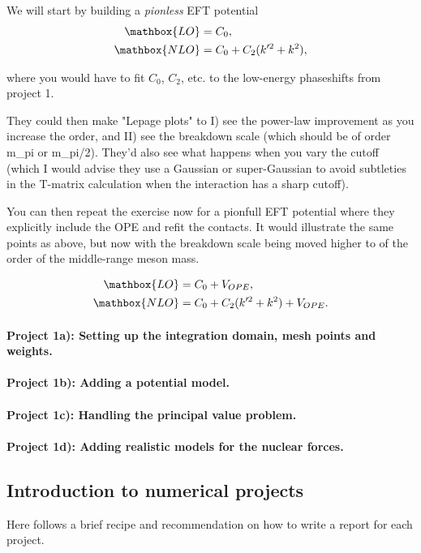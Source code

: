 \documentclass[%
oneside,                 %
final,                   %
10pt]{article}
\begin{document}
We will start by building  a \emph{pionless} EFT potential
\begin{align}
\mathbox{LO} &= C_0,\\
\mathbox{NLO} &= C_0 + C_2(k'^2+k^2),
\end{align}

where you would have to  fit $C_0$, $C_2$, etc. to the low-energy phaseshifts from project 1.  

They could then make "Lepage plots" to I) see the power-law improvement as you increase the order, and II) see the breakdown scale (which should be of order m_pi or m_pi/2). They'd also see what happens when you vary the cutoff (which I would advise they use a Gaussian or super-Gaussian to avoid subtleties in the T-matrix calculation when the interaction has a sharp cutoff).


You can  then repeat the exercise now for a pionfull EFT potential 
where they explicitly include the OPE and refit the contacts. It would 
illustrate the same points as above, but now with the breakdown scale being 
moved higher to of the order of the middle-range meson mass.

\begin{align}
\mathbox{LO} &= C_0+V_{OPE},\\
\mathbox{NLO} &= C_0 + C_2(k'^2+k^2)+V_{OPE}.
\end{align}
\paragraph{Project 1a): Setting up the integration domain, mesh points and weights.}
\paragraph{Project 1b): Adding a potential model.}
\paragraph{Project 1c): Handling the principal value problem.}
\paragraph{Project 1d): Adding realistic models for the nuclear forces.}
\subsection{Introduction to numerical projects}

Here follows a brief recipe and recommendation on how to write a report for each
project.
\end{document}
